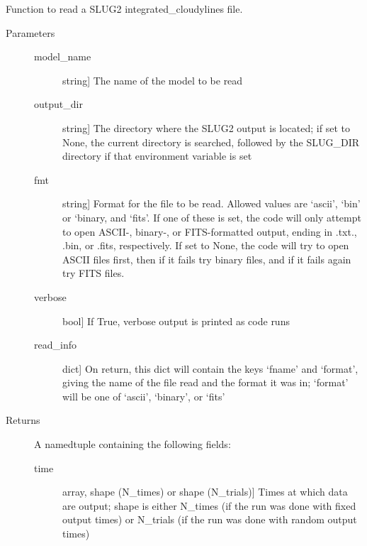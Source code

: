 \documentclass[letterpaper,10pt,english]{sphinxmanual}
\begin{document}
\begin{fulllineitems}
\label{\detokenize{cloudy:slugpy.cloudy.read_integrated_cloudylines}}
Function to read a SLUG2 integrated\_cloudylines file.
\begin{description}
\item[{Parameters}] \leavevmode\begin{description}
\item[{model\_name}] \leavevmode{[}string{]}
The name of the model to be read

\item[{output\_dir}] \leavevmode{[}string{]}
The directory where the SLUG2 output is located; if set to None,
the current directory is searched, followed by the SLUG\_DIR
directory if that environment variable is set

\item[{fmt}] \leavevmode{[}string{]}
Format for the file to be read. Allowed values are ‘ascii’,
‘bin’ or ‘binary, and ‘fits’. If one of these is set, the code
will only attempt to open ASCII-, binary-, or FITS-formatted
output, ending in .txt., .bin, or .fits, respectively. If set
to None, the code will try to open ASCII files first, then if
it fails try binary files, and if it fails again try FITS
files.

\item[{verbose}] \leavevmode{[}bool{]}
If True, verbose output is printed as code runs

\item[{read\_info}] \leavevmode{[}dict{]}
On return, this dict will contain the keys ‘fname’ and
‘format’, giving the name of the file read and the format it
was in; ‘format’ will be one of ‘ascii’, ‘binary’, or ‘fits’

\end{description}

\item[{Returns}] \leavevmode
A namedtuple containing the following fields:
\begin{description}
\item[{time}] \leavevmode{[}array, shape (N\_times) or shape (N\_trials){]}
Times at which data are output; shape is either N\_times (if
the run was done with fixed output times) or N\_trials (if
the run was done with random output times)


\end{description}
\end{description}
\end{fulllineitems}
\end{document}
